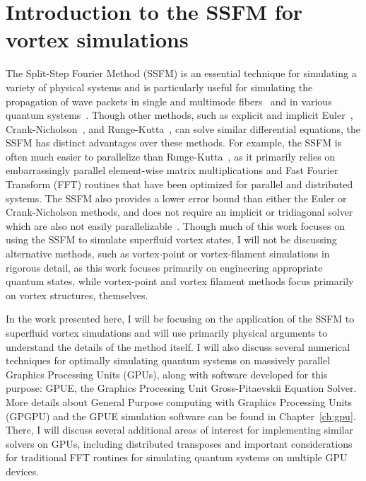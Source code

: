 \chapter{Introduction to the SSFM for vortex simulations}
\label{ch:splitop}
The Split-Step Fourier Method (SSFM) is an essential technique for simulating a variety of physical systems and is particularly useful for simulating the propagation of wave packets in single and multimode fibers~\cite{agrawal2000, sinkin2003, meirelles2005, min2003} and in various quantum systems~\cite{bayindir2015, weideman1986, wang2005}.
Though other methods, such as explicit and implicit Euler~\cite{butcher2016}, Crank-Nicholson~\cite{crank1947}, and Runge-Kutta~\cite{butcher2016}, can solve similar differential equations, the SSFM has distinct advantages over these methods.
For example, the SSFM is often much easier to parallelize than Runge-Kutta~\cite{brehler2017}, as it primarily relies on embarrassingly parallel element-wise matrix multiplications and Fast Fourier Transform (FFT) routines that have been optimized for parallel and distributed systems.
The SSFM also provides a lower error bound than either the Euler or Crank-Nicholson methods, and does not require an implicit or tridiagonal solver \cite{conte2017, thomas1949} which are also not easily parallelizable~\cite{goddeke2010, wang1981, sweet1977}.
Though much of this work focuses on using the SSFM to simulate superfluid vortex states, I will not be discussing alternative methods, such as vortex-point or vortex-filament simulations in rigorous detail, as this work focuses primarily on engineering appropriate quantum states, while vortex-point and vortex filament methods focus primarily on vortex structures, themselves.

In the work presented here, I will be focusing on the application of the SSFM to superfluid vortex simulations and will use primarily physical arguments to understand the details of the method itself.
I will also discuss several numerical techniques for optimally simulating quantum systems on massively parallel Graphics Processing Units (GPUs), along with software developed for this purpose: GPUE, the Graphics Processing Unit Gross-Pitaevskii Equation Solver.
More details about General Purpose computing with Graphics Processing Units (GPGPU) and the GPUE simulation software can be found in Chapter~\ref{ch:gpu}.
There, I will discuss several additional areas of interest for implementing similar solvers on GPUs, including distributed transposes and important considerations for traditional FFT routines for simulating quantum systems on multiple GPU devices.

